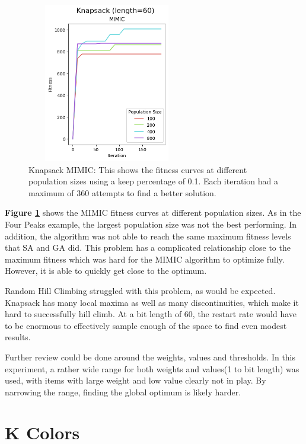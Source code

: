 \documentclass[letterpaper]{article} %
\begin{document}
\begin{figure}[htb]
\centering
\includegraphics[width=2.75in, height=2.75in]{figures/Knapsack_length=60_MIMIC_l_60_ma_360_p_100__200__400__800_k_0.1_.png}
\caption{Knapsack MIMIC: This shows the fitness curves at different population sizes using a keep percentage of 0.1. Each iteration had a maximum of 360 attempts to find a better solution. }
\label{fig:knapsack_mimic}
\end{figure}

\textbf{Figure \ref{fig:knapsack_mimic}} shows the MIMIC fitness curves at different population sizes.   As in the Four Peaks example, the largest population size was not the best performing.  In addition, the algorithm was not able to reach the same maximum fitness levels that SA and GA did.  This problem has a complicated relationship close to the maximum fitness which was hard for the MIMIC algorithm to optimize fully.  However, it is able to quickly get close to the optimum.

Random Hill Climbing struggled with this problem, as would be expected.  Knapsack has many local maxima as well as many discontinuities, which make it hard to successfully hill climb.   At a bit length of 60, the restart rate would have to be enormous to effectively sample enough of the space to find even modest results.

Further review could be done around the weights, values and thresholds.  In this experiment,  a rather wide range for both weights and values(1 to bit length) was used, with items with large weight and low value clearly not in play.  By narrowing the range, finding the global optimum is likely harder.  


\section{K Colors}
\end{document}
